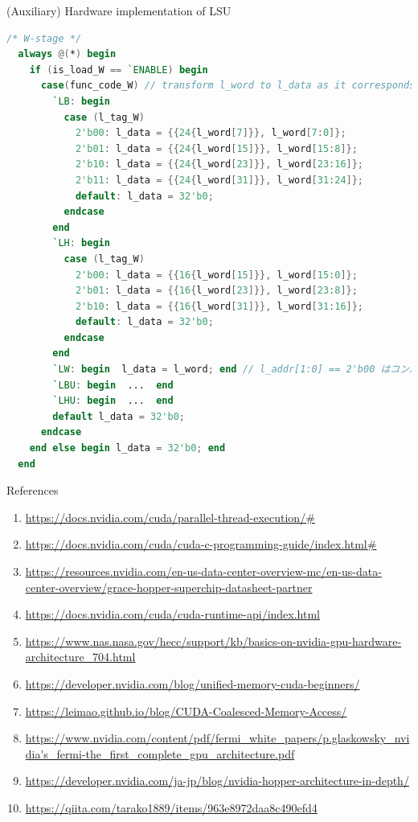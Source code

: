 \documentclass[dvipdfmx, 11pt, aspectratio=169]{beamer}   %
\begin{document}
\begin{frame}[fragile]{(Auxiliary) Hardware implementation of LSU}
  \vspace{-1.5\baselineskip}
    \begin{lstlisting}[language=verilog, basicstyle=\ttfamily\tiny]
  /* W-stage */
  always @(*) begin
    if (is_load_W == `ENABLE) begin
      case(func_code_W) // transform l_word to l_data as it corresponds to func_code
        `LB: begin
          case (l_tag_W)
            2'b00: l_data = {{24{l_word[7]}}, l_word[7:0]};
            2'b01: l_data = {{24{l_word[15]}}, l_word[15:8]};
            2'b10: l_data = {{24{l_word[23]}}, l_word[23:16]};
            2'b11: l_data = {{24{l_word[31]}}, l_word[31:24]};
            default: l_data = 32'b0;
          endcase
        end
        `LH: begin
          case (l_tag_W)
            2'b00: l_data = {{16{l_word[15]}}, l_word[15:0]};
            2'b01: l_data = {{16{l_word[23]}}, l_word[23:8]};
            2'b10: l_data = {{16{l_word[31]}}, l_word[31:16]};
            default: l_data = 32'b0;
          endcase
        end
        `LW: begin  l_data = l_word; end // l_addr[1:0] == 2'b00 はコンパイラが保証
        `LBU: begin  ...  end
        `LHU: begin  ...  end
        default l_data = 32'b0;
      endcase
    end else begin l_data = 32'b0; end
  end
\end{lstlisting}
\end{frame}
\begin{frame}[fragile]{References}
  \begin{enumerate}\footnotesize
    \item \url{https://docs.nvidia.com/cuda/parallel-thread-execution/#}
    \item \url{https://docs.nvidia.com/cuda/cuda-c-programming-guide/index.html#}
    \item \url{https://resources.nvidia.com/en-us-data-center-overview-mc/en-us-data-center-overview/grace-hopper-superchip-datasheet-partner}
    \item \url{https://docs.nvidia.com/cuda/cuda-runtime-api/index.html}
    \item \url{https://www.nas.nasa.gov/hecc/support/kb/basics-on-nvidia-gpu-hardware-architecture_704.html}
    \item \url{https://developer.nvidia.com/blog/unified-memory-cuda-beginners/}
    \item \url{https://leimao.github.io/blog/CUDA-Coalesced-Memory-Access/}
    \item \url{https://www.nvidia.com/content/pdf/fermi_white_papers/p.glaskowsky_nvidia's_fermi-the_first_complete_gpu_architecture.pdf}
    \item \url{https://developer.nvidia.com/ja-jp/blog/nvidia-hopper-architecture-in-depth/}
    \item \url{https://qiita.com/tarako1889/items/963e8972daa8c490efd4}
  \end{enumerate}
\end{frame}
\end{document}

